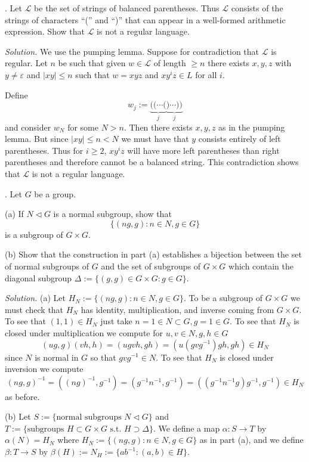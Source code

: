 \documentclass[10pt,a4paper,reqno]{amsart}
\begin{document}
\bigskip

. Let $\mathscr{L}$ be the set of strings of balanced parentheses.
Thus $\mathscr{L}$ consists of the strings of characters ``('' and ``)'' that
can appear in a well-formed arithmetic expression. Show that $\mathscr{L}$ is
not a regular language.

\bigskip

\emph{Solution.} We use the pumping lemma. Suppose for contradiction that
$\mathscr{L}$ is regular. Let $n$ be such that given $w \in \mathscr{L}$ of
length $\ge n$ there exists $x,y,z$ with $y \neq \varepsilon$ and $|xy| \le n$
such that  $w = xyz$ and $xy^iz \in L$ for all $i$.

Define \[w_j := \underbrace{( ( \cdots (}_{j} \underbrace{) \cdots ) )}_{j}\]
and consider $w_N$ for some $N > n$. Then there exists $x,y,z$ as in the
pumping lemma. But since $|xy| \le n < N$ we must have that $y$ consists
entirely of left parentheses. Thus for $i \ge 2$, $xy^iz$ will have more left
parentheses than right parentheses and therefore cannot be a balanced string.
This contradiction shows that $\mathscr{L}$ is not a regular language.
\bigskip

. Let $G$ be a group.

(a) If $N \triangleleft G$ is a normal subgroup, show that \[\{(ng,g) : n\in N,
g\in G\}\] is a subgroup of $G\times G$.

(b) Show that the construction in part (a) establishes a bijection between the
set of normal subgroups of $G$ and the set of subgroups of $G\times G$ which
contain the diagonal subgroup $\Delta := \{(g,g)\in G\times G : g\in G\}$.

\bigskip

\emph{Solution.} (a) Let $H_N := \{(ng,g) : n\in N, g\in G\}$. To be a subgroup
of $G\times G$ we must check that $H_N$ has identity, multiplication, and
inverse coming from $G\times G$. To see that $(1,1) \in H_N$ just take $n=1 \in
N \subset G, g = 1\in G$. To see that $H_N$ is closed under multiplication we
compute for $u,v\in N, g,h\in G$ \[(ug,g)(vh,h) = (ugvh,gh) = (u(gvg^{-1})gh,
gh) \in H_N\] since $N$ is normal in $G$ so that $gvg^{-1} \in N$. To see that
$H_N$ is closed under inversion we compute \[(ng,g)^{-1} = ( (ng) ^{-1}, g^{-1}
) = (g^{-1} n^{-1}, g^{-1}) = ( (g^{-1} n^{-1} g) g^{-1} , g^{-1}) \in H_N\] as
before.

(b) Let $S := \{\text{normal subgroups } N \triangleleft G\}$ and $T :=
\{\text{subgroups } H \subset G\times G \text{ s.t. } H \supset \Delta\}$. We
define a map $\alpha : S \rightarrow T$ by $\alpha(N) = H_N$ where $H_N :=
\{(ng,g) : n\in N, g\in G\}$ as in part (a), and we define $\beta : T
\rightarrow S$ by $\beta(H) := N_H := \{ab^{-1} : (a,b) \in H\}$.
\end{document}
